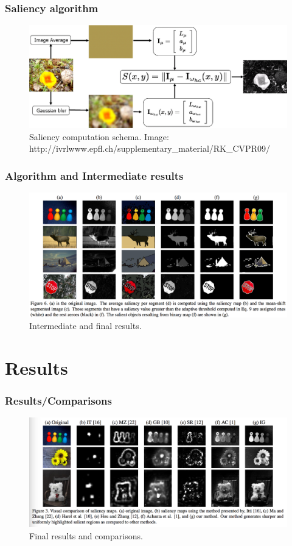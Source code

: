 \documentclass{beamer}
\begin{document}
\begin{frame}
    \frametitle{Saliency algorithm}
    \begin{figure}
        \includegraphics[width=.9\textwidth]{report-images/SaliencyAlgo.jpg}
        \caption{Saliency computation schema. Image: {http://ivrlwww.epfl.ch/supplementary\_material/RK\_CVPR09/}}
    \end{figure}
\end{frame}

\begin{frame}
    \frametitle{Algorithm and Intermediate results}
    \begin{figure}
        \includegraphics[width=.9\textwidth]{report-images/intermediate_results.png}
        \caption{Intermediate and final results\cite{achanta}.}
    \end{figure}
\end{frame}


\section{Results}

\begin{frame}
    \frametitle{Results/Comparisons}
    \begin{figure}
        \includegraphics[width=.9\textwidth]{report-images/results.png}
        \caption{Final results and comparisons\cite{achanta}.}
    \end{figure}
\end{frame}
\end{document}
